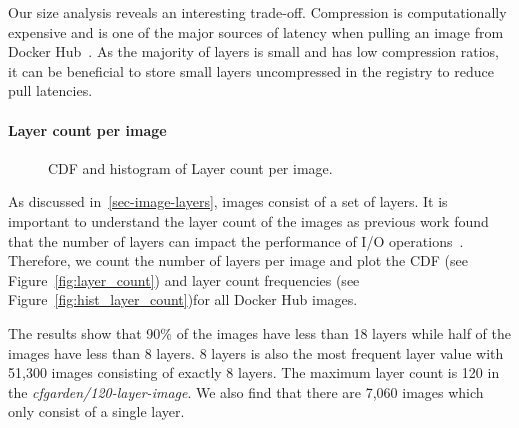 Our size analysis reveals an interesting trade-off. Compression is
computationally expensive and is one of the major sources of latency when
pulling an image from Docker Hub~\cite{slacker}.  As the majority of layers is
small and has low compression ratios, it can be beneficial to store small
layers uncompressed in the registry to reduce pull latencies.

\paragraph{Layer count per image}

\begin{figure}[!t]
	\centering
	\caption{CDF and histogram of Layer count per image.}
	\label{fig:image-size}
\end{figure}

As discussed in~\ref{sec-image-layers}, images consist of a set of layers.
It is important to understand the layer count of the images as previous
work found that the number of layers can impact the performance of
I/O operations~\cite{slacker}. Therefore, we count the number of layers
per image and plot the CDF (see Figure~\ref{fig:layer_count})
and layer count frequencies (see Figure~\ref{fig:hist_layer_count})for all
Docker Hub images.

The results show that 90\% of the images have less than 18 layers while
half of the images have less than 8 layers. 8 layers is also the most
frequent layer value with 51,300 images consisting of exactly 8 layers.
The maximum layer count is 120 in the \textit{cfgarden/120-layer-image}.
We also find that there are 7,060 images which only consist of a single layer.

